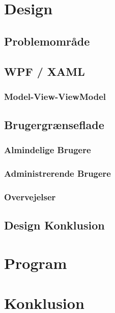 \chapter{Design}

\section{Problemområde}

\section{WPF / XAML}
\subsection{Model-View-ViewModel}

\section{Brugergrænseflade}
\subsection{Almindelige Brugere}
\subsection{Administrerende Brugere}
\subsection{Overvejelser}

\section{Design Konklusion}
%

\chapter{Program}


\chapter{Konklusion}
